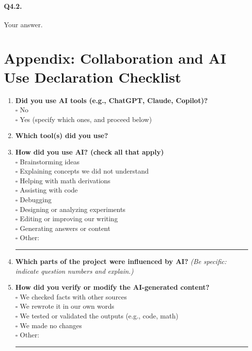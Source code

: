 \documentclass[11pt,a4paper]{article}
\begin{document}
\paragraph{Q4.2.} Your answer.





\clearpage
\newpage
\appendix


\section*{Appendix: Collaboration and AI Use Declaration Checklist}

\begin{enumerate}
\item \textbf{Did you use AI tools (e.g., ChatGPT, Claude, Copilot)?}\\
$\square$ No\\
$\square$ Yes (specify which ones, and proceed below)

\item \textbf{Which tool(s) did you use?}

\item \textbf{How did you use AI? (check all that apply)}\\
$\square$ Brainstorming ideas\\
$\square$ Explaining concepts we did not understand\\
$\square$ Helping with math derivations\\
$\square$ Assisting with code\\
$\square$ Debugging\\
$\square$ Designing or analyzing experiments\\
$\square$ Editing or improving our writing\\
$\square$ Generating answers or content\\
$\square$ Other: \rule{5cm}{0.4pt}

\item \textbf{Which parts of the project were influenced by AI?} \emph{(Be specific: indicate question numbers and explain.)}

\item \textbf{How did you verify or modify the AI-generated content?}\\
$\square$ We checked facts with other sources\\
$\square$ We rewrote it in our own words\\
$\square$ We tested or validated the outputs (e.g., code, math)\\
$\square$ We made no changes\\
$\square$ Other: \rule{5cm}{0.4pt}


\end{enumerate}
\end{document}
